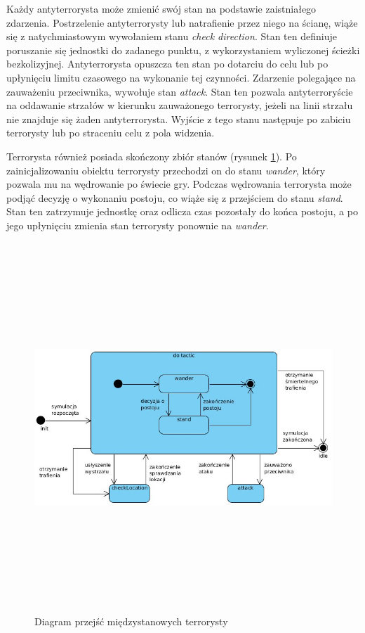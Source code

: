 Każdy antyterrorysta może zmienić swój stan na podstawie zaistniałego zdarzenia. Postrzelenie antyterrorysty lub natrafienie przez niego na ścianę, wiąże się z natychmiastowym wywołaniem stanu \emph{check direction}. Stan ten definiuje poruszanie się jednostki do zadanego punktu, z wykorzystaniem wyliczonej ścieżki bezkolizyjnej. Antyterrorysta opuszcza ten stan po dotarciu do celu lub po upłynięciu limitu czasowego na wykonanie tej czynności. Zdarzenie polegające na zauważeniu przeciwnika, wywołuje stan \emph{attack}. Stan ten pozwala antyterroryście na oddawanie strzałów w kierunku zauważonego terrorysty, jeżeli na linii strzału nie znajduje się żaden antyterrorysta. Wyjście z tego stanu następuje po zabiciu terrorysty lub po straceniu celu z pola widzenia.

Terrorysta również posiada skończony zbiór stanów (rysunek \ref{terTacticImage}). Po zainicjalizowaniu obiektu terrorysty przechodzi on do stanu \emph{wander}, który pozwala mu na wędrowanie po świecie gry. Podczas wędrowania terrorysta może podjąć decyzję o wykonaniu postoju, co wiąże się z przejściem do stanu \emph{stand}. Stan ten zatrzymuje jednostkę oraz odlicza czas pozostały do końca postoju, a po jego upłynięciu zmienia stan terrorysty ponownie na \emph{wander}.

\begin{figure}
\begin{center}
	\includegraphics[width=160mm,height=139mm]{images/terTactic}
	\caption{Diagram przejść międzystanowych terrorysty\label{terTacticImage}}
\end{center}
\end{figure}


